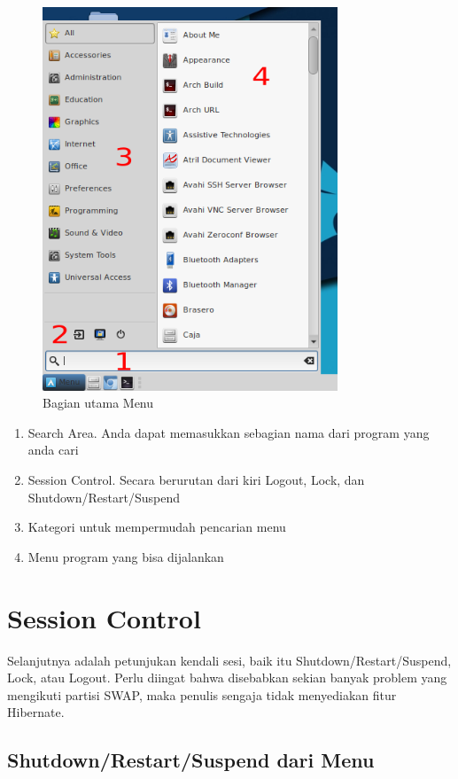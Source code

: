 \documentclass[12pt,]{article}
\begin{document}
	\begin{figure}[h]
		\centering
		\includegraphics[width=250pt]{png/menu_part}
		\caption{Bagian utama Menu}
	\end{figure}

	\begin{enumerate}
		\item Search Area. Anda dapat memasukkan sebagian nama dari program yang anda cari
		\item Session Control. Secara berurutan dari kiri Logout, Lock, dan Shutdown/Restart/Suspend
		\item Kategori untuk mempermudah pencarian menu
		\item Menu program yang bisa dijalankan
	\end{enumerate}

	\newpage

	\section{Session Control}

	Selanjutnya adalah petunjukan kendali sesi, baik itu Shutdown/Restart/Suspend, Lock, atau Logout.
	Perlu diingat bahwa disebabkan sekian banyak problem yang mengikuti partisi SWAP, maka penulis sengaja tidak menyediakan fitur Hibernate.

	\subsection{Shutdown/Restart/Suspend dari Menu}
\end{document}
